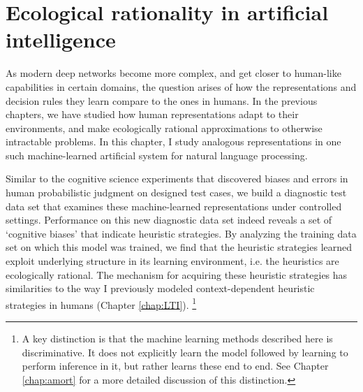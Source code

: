 \chapter{Ecological rationality in artificial intelligence}
\label{chap:sentences}

As modern deep networks become more complex, and get closer to human-like capabilities in certain domains, the question arises of how the representations and decision rules they learn compare to the ones in humans. In the previous chapters, we have studied how human representations adapt to their environments, and make ecologically rational approximations to otherwise intractable problems. In this chapter, I study analogous representations in one such machine-learned artificial system for natural language processing. 

Similar to the cognitive science experiments that discovered biases and errors in human probabilistic judgment on designed test cases\cite{tversky, fox1998belief, gigerenzer2011heuristic}, we build a diagnostic test data set that examines these machine-learned representations under controlled settings. Performance on this new diagnostic data set indeed reveals a set of `cognitive biases' that indicate heuristic strategies. By analyzing the training data set on which this model was trained, we find that the heuristic strategies learned exploit underlying structure in its learning environment, i.e. the heuristics are ecologically rational. The mechanism for acquiring these heuristic strategies has similarities to the way I previously modeled context-dependent heuristic strategies in humans (Chapter \ref{chap:LTI}). \footnote{A key distinction is that the machine learning methods described here is discriminative. It does not explicitly learn the model followed by learning to perform inference in it, but rather learns these end to end. See Chapter \ref{chap:amort} for a more detailed discussion of this distinction.} 


